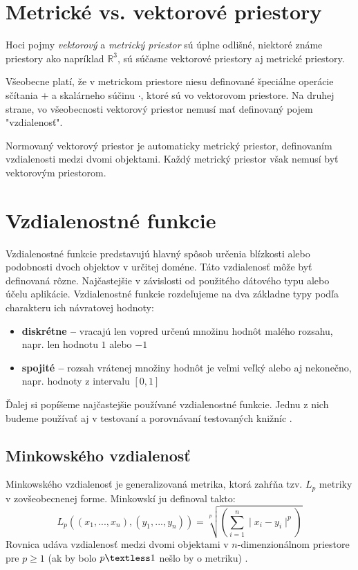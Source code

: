 \documentclass[12pt,a4paper,oneside]{fithesis2}
\begin{document}
    \section{Metrické vs. vektorové priestory}
    
    Hoci pojmy \textit{vektorový} a \textit{metrický priestor} sú úplne odlišné, niektoré známe priestory ako napríklad $\mathbb{R}^3$, sú súčasne vektorové priestory aj metrické priestory. 
    
    Všeobecne platí, že v metrickom priestore niesu definované špeciálne operácie sčítania $+$ a skalárneho súčinu $\cdot$, ktoré sú vo vektorovom priestore. Na druhej strane, vo všeobecnosti vektorový priestor nemusí mať definovaný pojem "vzdialenosť".
    
    Normovaný vektorový priestor je automaticky metrický priestor, definovaním vzdialenosti medzi dvomi objektami. Každý metrický priestor však nemusí byť vektorovým priestorom.
    
	\section{Vzdialenostné funkcie}
	
	Vzdialenostné funkcie predstavujú hlavný spôsob určenia blízkosti alebo podobnosti dvoch objektov v určitej doméne. Táto vzdialenosť môže byť definovaná rôzne. Najčastejšie v závislosti od použitého dátového typu alebo účelu aplikácie.
	Vzdialenostné funkcie rozdeľujeme na dva základne typy podľa charakteru ich návratovej hodnoty:
	\begin{itemize}
	\item \textbf{diskrétne --} vracajú len vopred určenú množinu hodnôt malého rozsahu, napr. 	     len hodnotu $1$ alebo $-1$
	\item \textbf{spojité --} rozsah vrátenej množiny hodnôt je veľmi veľký alebo aj nekonečno, 		napr. hodnoty z intervalu $[0,1]$
	\end{itemize}
	Ďalej si popíšeme najčastejšie používané vzdialenostné funkcie. Jednu z nich budeme používať aj v testovaní a porovnávaní testovaných knižníc \cite{Zezula2, Chavez:2001}.
\subsection{Minkowského vzdialenosť}
Minkowského vzdialenosť je generalizovaná metrika, ktorá zahŕňa tzv. $L_p$ metriky v zovšeobecnenej forme. Minkowskí ju definoval takto: 
\begin{equation*}
L_p((x_1,...,x_n),(y_1,...,y_n))=\sqrt[p]{\left(\sum\limits_{i=1}^n \mid x_i-y_i \mid^p \right)}
\end{equation*}
Rovnica udáva vzdialenosť medzi dvomi objektami v $n$-dimenzionálnom priestore pre $p\geq 1$ (ak by bolo $p \textless 1$ nešlo by o metriku) \cite{Zezula2}.
\end{document}
